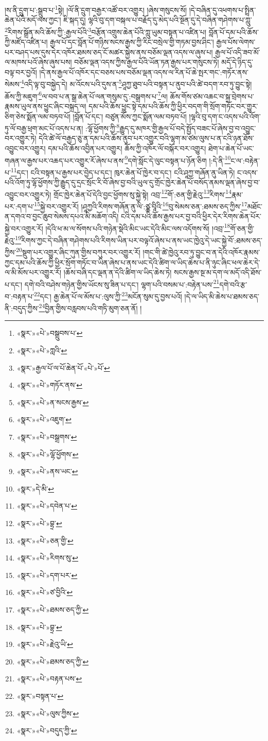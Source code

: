 །ས་ནི་དྲུག་པ་:སྒྲུབ་པ་\footnote{«སྣར་»«པེ་»བསྒྲུབས་པ་}སྟེ། །ལོ་ནི་དྲུག་བརྒྱར་འཚོ་བར་འགྱུར། །ཞེས་གསུངས་སོ། །དེ་བཞིན་དུ་འཕགས་པ་སྤྲིན་ཆེན་པོའི་མདོ་ལས་ཀྱང་། ཇི་སྐད་དུ། ལྷའི་བུ་དག་བསྐལ་པ་བརྗོད་དུ་མེད་པའི་སྔོན་དུ་དེ་བཞིན་གཤེགས་པ་ཀླུ་\footnote{«སྣར་»«པེ་»ཀླའི་}རིགས་སྒྲོན་མའི་ཆོས་ཀྱི་:རྒྱལ་པོའི་\footnote{«སྣར་»རྒྱལ་པོ་ལ་པོ་ཆེན་པོ་«པེ་»པོ་}བརྩོན་འགྲུས་ཆེན་པོའི་ཀླུ་ཡུམ་བསྟན་པ་འཛིན་པ། བློན་པོ་དམ་པའི་ཆོས་ཀྱི་མཛོད་འཛིན་པ། རྒྱལ་པོ་དང་བློན་པོ་གཉིས་སངས་རྒྱས་ཀྱི་རིང་བསྲེལ་གྱི་གཏམ་བྱས་ཤིང་། རྒྱལ་པོས་ལེགས་པར་བཤད་པས་དུས་དེར་འཁོར་ཐམས་ཅད་ངོ་མཚར་སྐྱེས་ནས་བཅོམ་ལྡན་འདས་ལ་ཞུས་པ། རྒྱལ་པོ་འདི་ཟབ་མོ་ལ་མཁས་པའོ་ཞེས་ཞུས་པས། བཅོམ་ལྡན་འདས་ཀྱིས་རྒྱལ་པོའི་ཡོན་ཏན་རྒྱས་པར་གསུངས་ཏེ། མདོ་དེ་ཉིད་དུ་བལྟ་བར་བྱའོ། །དེ་ནས་རྒྱལ་པོ་འཁོར་དང་བཅས་པས་བཅོམ་ལྡན་འདས་ལ་རིན་པོ་ཆེ་སྤར་གང་:གཏོར་ནས་སེམས་\footnote{«སྣར་»«པེ་»གཏོར་ནས་}འདི་ལྟ་བུ་བསྐྱེད་དེ། མ་འོངས་པའི་དུས་ན་\footnote{«སྣར་»«པེ་»ན་སངས་རྒྱས་}ཤཱཀྱ་ཐུབ་པའི་བསྟན་པ་ནུབ་པའི་ཚེ་བདག་རབ་ཏུ་བྱུང་སྟེ། ཆོས་ཀྱི་མཇུག་\footnote{«སྣར་»«པེ་»འཇུག་}ལ་བབ་པ་ན་སྒྲ་ཆེན་པོ་ལན་གསུམ་དུ་:བསྒྲགས་པ་\footnote{«སྣར་»«པེ་»བསྒྲགས་}ལ། ཆོས་གོས་ཙམ་འཆང་བ་སྐྲ་བྲེགས་པ་རྣམས་ཡུལ་ནས་ཕྱུང་ཞིང་བསྐྲད་ལ། དམ་པའི་ཆོས་ཕྱུང་སྟེ་དམ་པའི་ཆོས་ཀྱི་ཕྱིར་བདག་གི་སྲོག་གཏོང་བར་གྱུར་ཅིག་ཅེས་སྨོན་ལམ་བཏབ་པོ། །བློན་པོ་དང་། བཙུན་མོས་ཀྱང་སྨོན་ལམ་བཏབ་པོ། །ལྷའི་བུ་དག་ང་འདས་པའི་འོག་ཏུ་ལོ་བརྒྱ་ཕྲག་མང་པོ་འདས་པ་ན། :ལྷོ་ཕྱོགས་ཀྱི་\footnote{«སྣར་»«པེ་»ལྷོ་ཕྱོགས་}རྒྱུད་དུ་མཁར་གྱི་རྒྱལ་པོ་བདེ་སྤྱོད་བཟང་པོ་ཞེས་བྱ་བ་འབྱུང་བར་འགྱུར་ཏེ། དེའི་ཚེ་ལོ་བརྒྱད་ཅུ་ན་དམ་པའི་ཆོས་ནུབ་པར་འགྱུར་བའི་ལྷག་མ་ཙམ་ལུས་པ་ན་ངའི་ཉན་ཐོས་འབྱུང་བར་འགྱུར། དམ་པའི་ཆོས་འབྱིན་པར་འགྱུར། ཆོས་ཀྱི་འཁོར་ལོ་བསྐོར་བར་འགྱུར། ཐེག་པ་ཆེན་པོ་ཡང་གཞན་ལ་རྒྱས་པར་འཆད་པར་འགྱུར་རོ་ཞེས་པ་ནས་\footnote{«སྣར་»«པེ་»ནས་ཡང་}དགེ་སློང་དེ་ལུང་བསྟན་པ་ཉོན་ཅིག །:དེ་ནི་\footnote{«སྣར་»དེ་མི་}ང་ལ་:བརྟེན་པ་\footnote{«སྣར་»«པེ་»དབེན་པ་}དང་། ངའི་བསྟན་པ་རྒྱས་པར་བྱེད་པ་དང་། ཁུར་ཆེན་པོ་ཁྱེར་བ་དང་། ངའི་ཤཱཀྱ་གཞོན་ནུ་ཡིན་ཏེ། ང་འདས་པའི་འོག་ཏུ་ལྷོ་ཕྱོགས་ཀྱི་རྒྱུད་དུ་དྲང་སྲོང་རི་བོ་ཞེས་བྱ་བའི་ཡུལ་དུ་གྲོང་ཁྱེར་ཆེན་པོ་བསོད་ནམས་ལྡན་ཞེས་བྱ་བ་འབྱུང་བར་འགྱུར་ཏེ། གྲོང་ཁྱེར་ཆེན་པོ་དེའི་བྱང་ཕྱོགས་སུ་སྐྱེ་སྟེ། འབྲ་\footnote{«སྣར་»«པེ་»བྷྲ་}གོ་:ཅན་གྱི་རྗེའུ་\footnote{«སྣར་»«པེ་»ཅན་གྱི་}རིགས་\footnote{«སྣར་»«པེ་»རིགས་སུ་}རྣམ་པར་:དག་པ་\footnote{«སྣར་»«པེ་»དག་པར་}སྐྱེ་བར་འགྱུར་རོ། །ཤཱཀྱའི་རིགས་གཞོན་ནུ་ལི་:ཙྪ་བཱིའི་\footnote{«སྣར་»«པེ་»ཙ་བྱིའི་}བུ་སེམས་ཅན་:ཐམས་ཅད་ཀྱིས་\footnote{«སྣར་»«པེ་»ཐམས་ཅད་ཀྱི་}མཐོང་ན་དགའ་བ་བྱང་ཆུབ་སེམས་དཔའ་མི་མཆོག་འདི། ངའི་དམ་པའི་ཆོས་རྒྱས་པར་བྱ་བའི་ཕྱིར་དེར་རིགས་ཆེན་པོར་སྐྱེ་བར་འགྱུར་རོ། །དེའི་ཕ་མ་ལ་སོགས་པའི་གཉེན་སྡེའི་མིང་ཡང་དེའི་མིང་ལས་འདོགས་སོ། །འབྲ་\footnote{«སྣར་»«པེ་»བྷྲ་}གོ་ཅན་གྱི་རྗེའུ་\footnote{«སྣར་»«པེ་»རྗེའུ་ཡི་}རིགས་ཀྱང་དེ་བཞིན་གཤེགས་པའི་རིགས་ཡིན་པར་བལྟའོ་ཞེས་པ་ནས་ཡང་ཁྱེའུ་དེ་ཡང་སྐྱེ་བོ་:ཐམས་ཅད་ཀྱིས་\footnote{«སྣར་»«པེ་»ཐམས་ཅད་ཀྱི་}སྡུག་པར་འགྱུར་ཞིང་ཀུན་གྱིས་བཀུར་བར་འགྱུར་རོ། །གང་གི་ཚེ་ཁྱེའུ་རབ་ཏུ་བྱུང་བ་ན་དེའི་འཁོར་རྣམས་ཀྱང་དམ་པའི་ཆོས་ཀྱི་ཕྱིར་སྲོག་གཏོང་བ་ཡིན་ཞེས་པ་ནས་ཡང་དེའི་ཚིག་ལ་ཡིད་ཆེས་པ་ནི་ཉུང་ཞིང་ཕལ་ཆེར་དེ་ལ་མི་མོས་པར་འགྱུར་རོ། །ཆོས་བཞི་དང་ལྡན་ན་དེའི་ཚིག་ལ་ཡིད་ཆེས་ཏེ། སངས་རྒྱས་སྔ་མ་དག་ལ་མདོ་འདི་ཐོས་པ་དང་། དགེ་བའི་བཤེས་གཉེན་གྱིས་ཡོངས་སུ་ཟིན་པ་དང་། ལྷག་པའི་བསམ་པ་:བརྟེན་པས་\footnote{«སྣར་»«པེ་»བརྟན་པས་}དགེ་བའི་རྩ་བ་:བརྟན་པ་\footnote{«སྣར་»བསྟན་པ་}དང་། རྒྱ་ཆེན་པོ་ལ་མོས་པ་:ལུས་ཀྱི་\footnote{«སྣར་»«པེ་»ལུས་ཀྱིས་}མངོན་སུམ་དུ་བྱས་པའོ། །དེ་ལ་ཡིད་མི་ཆེས་པ་ཐམས་ཅད་ནི་:བདུད་ཀྱིས་\footnote{«སྣར་»«པེ་»བདུད་ཀྱི་}བྱིན་གྱིས་བརླབས་པའི་གཏི་མུག་ཅན་ནོ། །
